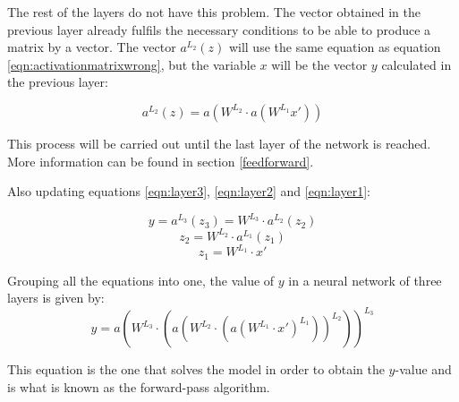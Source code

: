 The rest of the layers do not have this problem. The vector obtained in the previous layer already fulfils the necessary conditions to be able to produce a matrix by a vector. The vector $a^{L_2}(z)$ will use the same equation as equation \ref{eqn:activationmatrixwrong}, but the variable $x$ will be the vector $y$ calculated in the previous layer:

\begin{equation}
  a^{L_2}(z) = a(W^{L_2} \cdot a(W^{L_1}x'))
\end{equation}

This process will be carried out until the last layer of the network is reached. More information can be found in section \ref{feedforward}.
\newline

Also updating equations  \ref{eqn:layer3}, \ref{eqn:layer2} and \ref{eqn:layer1}:

\begin{equation}
    y = a^{L_3}(z_3) = W^{L_3} \cdot a^{L_2}(z_2) 
\end{equation}
\begin{equation}
    z_2 = W^{L_2} \cdot a^{L_1}(z_1)
\end{equation}
\begin{equation}
    z_1 = W^{L_1} \cdot x'
\end{equation}

Grouping all the equations into one, the value of $y$ in a neural network of three layers is given by:
\begin{equation}
    y = a(W^{L_3} \cdot (a(W^{L_2} \cdot (a(W^{L_1} \cdot x')^{L_1}))^{L_2}))^{L_3}
    \label{eqn:feedforwardexample}
\end{equation}

This equation is the one that solves the model in order to obtain the $y$-value and is what is known as the forward-pass algorithm.
\newline
